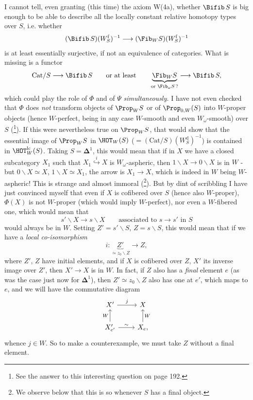 I cannot tell, even granting (this time) the axiom W(4a), whether $\Bifib\, S$ is big enough to be able to describe all the locally constant relative homotopy types over $S$, i.e. whether %
\[ (\Bifib\, S)(W^{\mathrm{f}}_S)^{-1} \longrightarrow (\Fib_W S)(W^{\mathrm{f}}_S)^{-1} \]
is at least essentially surjective, if not an equivalence of categories. What is missing is a functor
\[ \mathrm{Cat}/S \longrightarrow \Bifib\, S \qquad \text{or at least} \qquad \underbrace{\Fib_W S}_{\text{or $\Fib_\omega S$\,?}} \longrightarrow \Bifib\, S, \]
which could play the role of $\Phi$ and of $\Psi$ \textit{simultaneously.} I have not even checked that $\Phi$ does \textit{not} transform objects of $\Prop_W S$ or of $\Prop_{0,W}(S)$ into $W$-proper objects (hence $W$-perfect, being in any case $W$-smooth and even $W_\omega$-smooth) over $S$ (\footnote{See the answer to this interesting question on page 192.}). If this were nevertheless true on $\Prop_W S$, that would show that the essential image of $\Prop_W S$ in $\HOT_W(S)$ ($= (\mathrm{Cat}/S)(W^{\mathrm{d}}_S)^{-1}$) is contained in $\HOT^{\mathrm{lc}}_W(S)$. %
Taking $S = \mathbf{\Delta}^1$, this would mean that if in $X$ we have a closed subcategory $X_1$ such that $X_1 \overset{i}{\hookrightarrow} X$ is $W_\omega$-aspheric, then $1\backslash X \longrightarrow 0\backslash X$ is in $W$ - but $0\backslash X \simeq X$, $1\backslash X \simeq X_1$, the arrow is $X_1 \longrightarrow X$, which is indeed in $W$ being $W$-aspheric! This is strange and almost immoral (\footnote{We observe below that this is so whenever $S$ has a final object.}). But by dint of scribbling I have just convinced myself that even if $X$ is cofibered over $S$ (hence also $W$-proper), $\Phi(X)$ is not $W$-proper (which would imply $W$-perfect), nor
even a $W$-fibered one, which would mean that
\[ s'\backslash X \longrightarrow s\backslash X \qquad \text{associated to } s \longrightarrow s' \text{ in } S \]
would always be in $W$. Setting $Z' = s'\backslash S$, $Z = s\backslash S$, this would mean that if we have a \textit{local co-isomorphism}
\[ i : \underbrace{Z'}_{\simeq z_0\backslash Z} \longrightarrow Z, \]
where $Z'$, $Z$ have initial elements, and if $X$ is cofibered over $Z$, $X'$ its inverse image over $Z'$, then $X' \longrightarrow X$ is in $W$. In fact, if $Z$ also has a \textit{final} element $e$ (as was the case just now for $\mathbf{\Delta}^1$), then $Z' \simeq z_0\backslash Z$ also has one at $e'$, which maps to $e$, and we will have the commutative diagram
\[
\begin{tikzcd}
X' \arrow[r, "j"] & X \\
X'_{e'} \arrow[u, "W"] \arrow[r, "\sim"] & X_e, \arrow[u, "W"']
\end{tikzcd}
\]
whence $j \in W$. So to make a counterexample,
we must take $Z$ without a final element.


